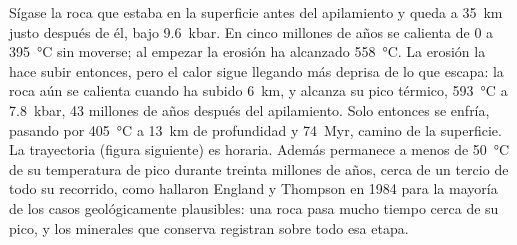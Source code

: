 Sígase la roca que estaba en la superficie antes del apilamiento y queda a \qty{35}{km} justo
después de él, bajo \qty{9.6}{kbar}. En cinco millones de años se calienta de 0 a
\qty{395}{\celsius} sin moverse; al empezar la erosión ha alcanzado
\qty{558}{\celsius}. La erosión la hace subir entonces, pero el calor sigue llegando más deprisa de lo que
escapa: la roca aún se calienta cuando ha subido \qty{6}{km}, y alcanza su pico
térmico, \qty{593}{\celsius} a \qty{7.8}{kbar}, 43 millones de años después del apilamiento. Solo
entonces se enfría, pasando por \qty{405}{\celsius} a \qty{13}{km} de profundidad y
\qty{74}{Myr}, camino de la superficie. La trayectoria (figura siguiente) es horaria. Además
permanece a menos de \qty{50}{\celsius} de su temperatura de pico durante treinta millones de años, cerca de un
tercio de todo su recorrido, como hallaron England y Thompson en 1984 para la mayoría de los casos
geológicamente plausibles: una roca pasa mucho tiempo cerca de su pico, y los minerales que conserva
registran sobre todo esa etapa.

